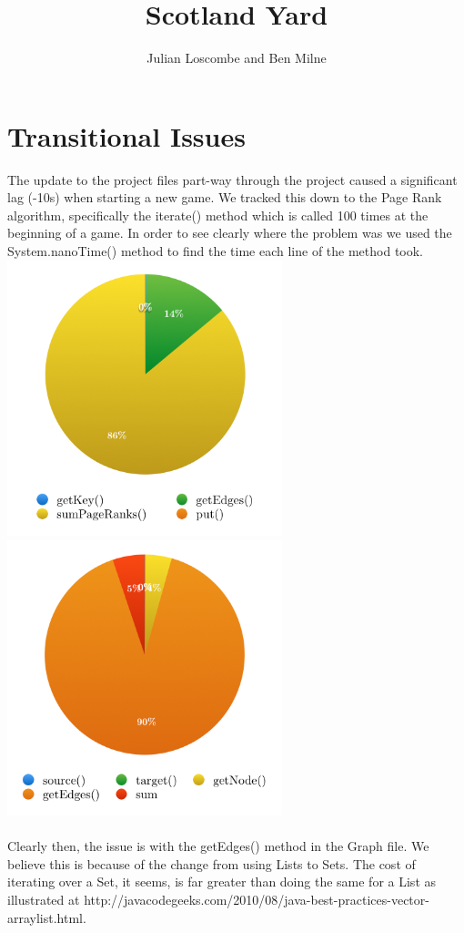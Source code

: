\documentclass[a4paper, 12pt]{article}
\title{Scotland Yard}
\author{Julian Loscombe and Ben Milne}
\begin{document}
\maketitle
\section{Transitional Issues}
The update to the project files part-way through the project caused a significant lag (-10s) when starting a new game. We tracked this down to the Page Rank algorithm, specifically the iterate() method which is called 100 times at the beginning of a game. In order to see clearly where the problem was we used the System.nanoTime() method to find the time each line of the method took.\\
\includegraphics[width = 8cm]{iterate}
\includegraphics[width = 8cm]{sumPageRanks}\\
\\
Clearly then, the issue is with the getEdges() method in the Graph file. We believe this is because of the change from using Lists to Sets. The cost of iterating over a Set, it seems, is far greater than doing the same for a List as illustrated at http://javacodegeeks.com/2010/08/java-best-practices-vector-arraylist.html.\\
\end{document}
